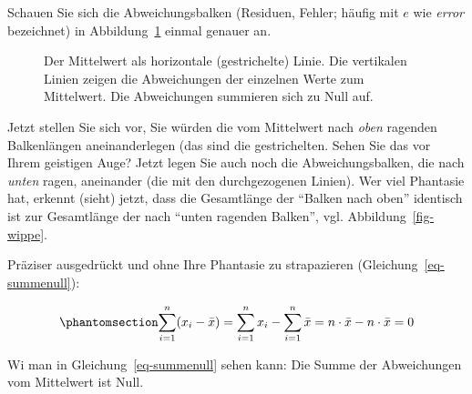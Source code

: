 \documentclass[
  letterpaper,
]{scrbook}
\theoremstyle{definition}
\theoremstyle{definition}
\theoremstyle{definition}
\theoremstyle{remark}
\begin{document}
Schauen Sie sich die Abweichungsbalken (Residuen, Fehler; häufig mit
\(e\) wie \emph{error} bezeichnet) in Abbildung~\ref{fig-mw1} einmal
genauer an.

\begin{figure}


\caption{\label{fig-mw1}Der Mittelwert als horizontale (gestrichelte)
Linie. Die vertikalen Linien zeigen die Abweichungen der einzelnen Werte
zum Mittelwert. Die Abweichungen summieren sich zu Null auf.}

\end{figure}%

Jetzt stellen Sie sich vor, Sie würden die vom Mittelwert nach
\emph{oben} ragenden Balkenlängen aneinanderlegen (das sind die
gestrichelten. Sehen Sie das vor Ihrem geistigen Auge? Jetzt legen Sie
auch noch die Abweichungsbalken, die nach \emph{unten} ragen, aneinander
(die mit den durchgezogenen Linien). Wer viel Phantasie hat, erkennt
(sieht) jetzt, dass die Gesamtlänge der \enquote{Balken nach oben}
identisch ist zur Gesamtlänge der nach \enquote{unten ragenden Balken},
vgl. Abbildung~\ref{fig-wippe}.

Präziser ausgedrückt und ohne Ihre Phantasie zu strapazieren
(Gleichung~\ref{eq-summenull}):

\begin{equation}\phantomsection\label{eq-summenull}{\sum_{i=1}^n (x_i-\bar{x})=\sum_{i=1}^n x_i - \sum_{i=1}^n \bar{x} = n\cdot \bar{x} - n\cdot \bar{x}=0}\end{equation}

Wi man in Gleichung~\ref{eq-summenull} sehen kann: Die Summe der
Abweichungen vom Mittelwert ist Null.
\end{document}
